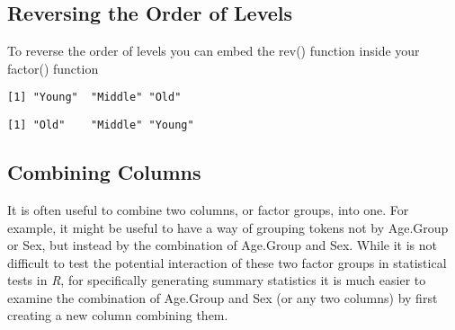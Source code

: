 \documentclass[
  12pt,
  letterpaper]{article}
\newenvironment{Shaded}{\begin{snugshade}}{\end{snugshade}}
\newcommand{\AttributeTok}[1]{\textcolor[rgb]{0.40,0.45,0.13}{#1}}
\newcommand{\FunctionTok}[1]{\textcolor[rgb]{0.28,0.35,0.67}{#1}}
\newcommand{\NormalTok}[1]{\textcolor[rgb]{0.00,0.23,0.31}{#1}}
\newcommand{\OtherTok}[1]{\textcolor[rgb]{0.00,0.23,0.31}{#1}}
\newcommand{\SpecialCharTok}[1]{\textcolor[rgb]{0.37,0.37,0.37}{#1}}
\renewcommand\texttt[1]{{\ttfamily\color{BrickRed}#1}}
\begin{document}
\hypertarget{reversing-the-order-of-levels}{%
\subsection{Reversing the Order of
Levels}\label{reversing-the-order-of-levels}}

To reverse the order of levels you can embed the \texttt{rev()} function
inside your \texttt{factor()} function

\begin{Shaded}
\end{Shaded}

\begin{verbatim}
[1] "Young"  "Middle" "Old"   
\end{verbatim}

\begin{Shaded}
\end{Shaded}

\begin{verbatim}
[1] "Old"    "Middle" "Young" 
\end{verbatim}

\hypertarget{combining-columns}{%
\subsection{Combining Columns}\label{combining-columns}}

It is often useful to combine two columns, or factor groups, into one.
For example, it might be useful to have a way of grouping tokens not by
\texttt{Age.Group} or \texttt{Sex}, but instead by the combination of
\texttt{Age.Group} and \texttt{Sex}. While it is not difficult to test
the potential interaction of these two factor groups in statistical
tests in \emph{R}, for specifically generating summary statistics it is
much easier to examine the combination of \texttt{Age.Group} and
\texttt{Sex} (or any two columns) by first creating a new column
combining them.
\end{document}
